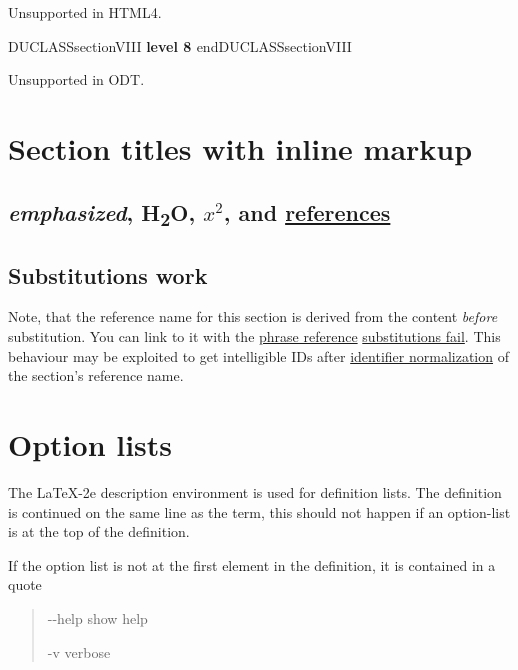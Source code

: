 \documentclass[a4paper]{article}
\newenvironment{DUclass}[1]%
  {%
   \def\DocutilsClassFunctionName{DUCLASS#1}
     \csname \DocutilsClassFunctionName \endcsname}%
  {\csname end\DocutilsClassFunctionName \endcsname}%
\providecommand*{\DUoptionlistlabel}[1]{\bfseries #1 \hfill}
\newenvironment{DUoptionlist}{%
    \list{}{\setlength{\labelwidth}{\DUoptionlistindent}
            \setlength{\rightmargin}{1cm}
            \setlength{\leftmargin}{\rightmargin}
            \addtolength{\leftmargin}{\labelwidth}
            \addtolength{\leftmargin}{\labelsep}
            \renewcommand{\makelabel}{\DUoptionlistlabel}}
  }
  {\endlist}
\providecommand*{\DUtitle}[1]{%
  \smallskip\noindent\textbf{#1}\smallskip}
\begin{document}
Unsupported in HTML4.


\begin{DUclass}{sectionVIII}
\DUtitle{level 8%
  \label{level-8}%
}
\end{DUclass}

Unsupported in ODT.


\section{Section titles with inline markup%
  \label{section-titles-with-inline-markup}%
  \label{references}%
}


\subsection{\emph{emphasized}, H\textsubscript{2}O, $x^2$, and \hyperref[references]{references}%
  \label{emphasized-h2o-x-2-and-references}%
}


\subsection{Substitutions work%
  \label{substitutions-fail}%
}

Note, that the \textquotedbl{}reference name\textquotedbl{} for this section is derived from the
content \emph{before} substitution. You can link to it with the \href{https://docutils.sourceforge.io/docs/ref/rst/restructuredtext.html\#hyperlink-references}{phrase
reference} \textquotedbl{}\hyperref[substitutions-fail]{substitutions fail}\textquotedbl{}.
This behaviour may be exploited to get intelligible IDs after \href{https://docutils.sourceforge.io/docs/ref/rst/directives.html\#identifier-normalization}{identifier
normalization} of the section's reference name.



\section{Option lists%
  \label{option-lists}%
}

The LaTeX-2e description environment is used for definition lists.
The definition is continued on the same line as the term, this should
not happen if an option-list is at the top of the definition.

If the option list is not at the first element in the definition, it
is contained in a quote

\begin{quote}
\begin{DUoptionlist}
\item[-{}-help]  show help

\item[-v]  verbose
\end{DUoptionlist}
\end{quote}
\end{document}
